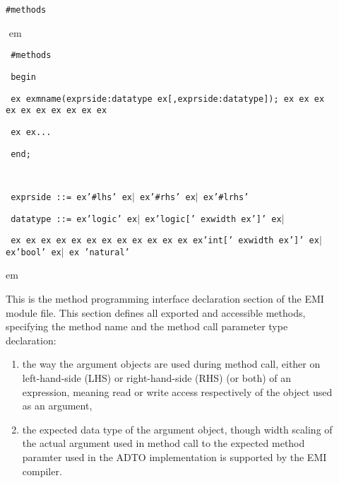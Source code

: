 \documentclass[a4paper,12pt,twoside,english]{article}
\def\s{\hskip 1.15 ex}
\begin{document}
\def\thesubsection{\tocXCV}
\secII{\label{toclabelXCV}\thesubsection}
\begin{description}
\item[] $ $\\
{\tt \#methods}

\item[]
\def\prefskipu{}\def\prefskipo{}\def\prefskipa{}\def\prefskipu{\hskip10pt}\def\prefskipo{\hskip10pt}\def\prefskipa{\hskip20pt}\def\content{
\vskip-5pt{\parindent0pt\parbox{\linewidth}{\tt\smallsize\hskip10pt \#methods}}
\vskip-5pt{\parindent0pt\parbox{\linewidth}{\tt\smallsize\hskip10pt begin}}
\vskip-5pt{\parindent0pt\parbox{\linewidth}{\tt\smallsize\hskip10pt \s \s mname(exprside:datatype\s {[},exprside:datatype{]});\s \s \s \s \s \s \s \s \s \s }}
\vskip-5pt{\parindent0pt\parbox{\linewidth}{\tt\smallsize\hskip10pt \s \s ...}}
\vskip-5pt{\parindent0pt\parbox{\linewidth}{\tt\smallsize\hskip10pt end;}}
\vskip-5pt{\parindent0pt\parbox{\linewidth}{\tt\smallsize\hskip10pt }}
\vskip-5pt{\parindent0pt\parbox{\linewidth}{\tt\smallsize\hskip10pt exprside~::=\s '\#lhs'\s $|$\s '\#rhs'\s $|$\s '\#lrhs'}}
\vskip-5pt{\parindent0pt\parbox{\linewidth}{\tt\smallsize\hskip10pt datatype~::=\s 'logic'\s $|$\s 'logic{[}'\s width\s '{]}'\s $|$}}
\vskip-5pt{\parindent0pt\parbox{\linewidth}{\tt\smallsize\hskip10pt \s \s \s \s \s \s \s \s \s \s \s \s \s 'int{[}'\s width\s '{]}'\s $|$\s 'bool'\s $|$\s
'natural'}}
}
$ $
 em
\content
{} em
\item[] $ $\\
This is the method programming interface declaration section of the EMI module file. This section defines all exported and accessible methods,  specifying  the
method name and the method call parameter type declaration:


\begin{enumerate}
\item the way the argument objects are used during method call, either on left-hand-side (LHS) or right-hand-side (RHS) (or both) of an expression, meaning read
or write access respectively of the object used as an argument,

\item the expected data type of the argument object,  though width scaling of the actual argument used in method call to the expected method paramter used in
the ADTO implementation is supported by the EMI compiler.



\end{enumerate}
\end{description}
\end{document}
